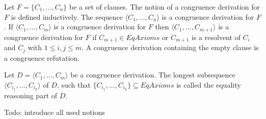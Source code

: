 Let $F = \{C_1, \ldots, C_n\}$ be a set of clauses.
The notion of a congruence derivation for $F$ is defined inductively.
The sequence $\langle C_1, \ldots, C_n\rangle$ is a congruence derivation for $F$.
If $\langle C_1, \ldots, C_m\rangle$ is a congruence derivation for $F$ then $\langle C_1, \ldots, C_{m+1} \rangle$ is a congruence derivation for $F$ if $C_{m+1} \in EqAxioms$ or $C_{m+1}$ is a resolvent of $C_i$ and $C_j$ with $1 \leq i,j \leq m$.
A congruence derivation containing the empty clause is a congruence refutation.

Let $D = \langle C_1, \ldots, C_m\rangle$ be a congruence derivation.
The longest subsequence $\langle C_{i_1}, \ldots, C_{i_k}\rangle$ of $D$, such that $\{C_{i_1}, \ldots, C_{i_k}\} \subseteq EqAxioms$ is called the equality reasoning part of $D$.


{\color{blue} Todo: introduce all used notions}